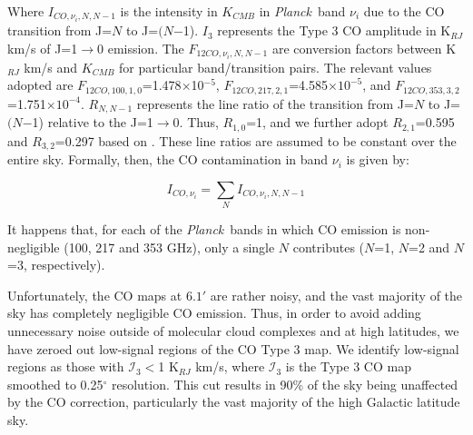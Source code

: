 \documentclass{emulateapj}
\newcommand{\PLANCK}{{\it Planck}}
\begin{document}
Where $I_{CO, \nu_i, N, N-1}$ is the intensity in $K_{CMB}$ in \PLANCK~band 
$\nu_i$ due to the CO transition from J=$N$ to J=$(N$$-$1). $I_3$ represents 
the Type 3 CO amplitude in  K$_{RJ}$ km/s of J=1$\rightarrow$0 emission. The 
$F_{12CO, \nu_i, N, N-1}$ are conversion factors between K$_{RJ}$ km/s and 
$K_{CMB}$ for particular band/transition pairs. The relevant values adopted are
$F_{12CO, 100, 1, 0}$=1.478$\times$10$^{-5}$, 
$F_{12CO, 217, 2, 1}$=4.585$\times$$10^{-5}$, and 
$F_{12CO, 353, 3, 2}$=1.751$\times$$10^{-4}$.
$R_{N, N-1}$ represents the line ratio of the transition from J=$N$ to 
J=$(N$$-$1) relative to the J=1$\rightarrow$0. Thus, $R_{1,0}$=1, and we 
further adopt $R_{2,1}$=0.595 and $R_{3,2}$=0.297 based on \cite{planckco}. 
These line ratios are assumed to be constant over the entire sky. Formally, 
then, the CO contamination in band $\nu_i$ is given by:

\begin{equation}
I_{CO, \nu_i} = \sum\limits_{N} I_{CO, \nu_i, N, N-1}
\end{equation}

It happens that, for each of the \PLANCK~bands in which CO emission is
non-negligible (100, 217 and 353 GHz), only a single $N$ contributes ($N$=1, 
$N$=2 and $N$=3, respectively). 

Unfortunately, the CO maps at $6.1'$ are rather noisy,
and the vast majority of the sky has completely negligible CO emission. Thus,
in order to avoid adding unnecessary noise outside of molecular cloud complexes
and at high latitudes, we have zeroed out low-signal regions of the CO Type 3
map. We identify  low-signal regions as those with $\mathcal{I}_3$$<$1 K$_{RJ}$
 km/s, where $\mathcal{I}_3$ is the Type 3 CO map smoothed to 0.25$^{\circ}$ 
resolution. This cut results in 90\% of the sky being unaffected by the CO 
correction, particularly the vast majority of the high Galactic latitude sky.




\end{document}
